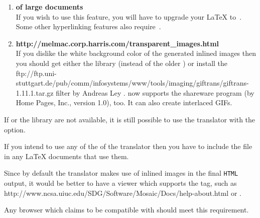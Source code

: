 \begin{enumerate}
%
%
\item 
\textbf{ of large documents}\\
If you wish to use this feature, you will have to upgrade your
\LaTeX{} to \LaTeXe\,. 
Some other hyperlinking features also require \LaTeXe\,.

%
%
\item 
\textbf{%
{http://melmac.corp.harris.com/transparent\_images.html}}\\
If you dislike the white background color of the
generated inlined images then you should get either 
the  library (instead of the older ) 
or install the %
{ftp://ftp.uni-stuttgart.de/pub/comm/infosystems/www/tools/imaging/giftrans/giftrans-1.11.1.tar.gz}
filter by Andreas Ley . 
\latextohtml{} now supports the shareware program 
(by Home Pages, Inc., version 1.0), too.
It can also create interlaced GIFs.
%
\end{enumerate} 

%

\noindent
If  or the  library are
not available, it is still possible to use the translator with the
 option. 

%
%
\html{\\}%

If you intend to use any of the 
of the translator 
then you have to include the  file 
in any \LaTeX{}  documents that use them. 

%
%
%
%
%
%
\html{\\}%

Since by default the translator makes use of inlined images in the final 
\texttt{HTML} output, it would be better to have a viewer 
which supports the  tag, such as %
{http://www.ncsa.uiuc.edu/SDG/Software/Mosaic/Docs/help-about.html}
or .
\begin{changebar}
Any browser which claims to be compatible with \HTMLiii{} should meet
this requirement.
\end{changebar}

